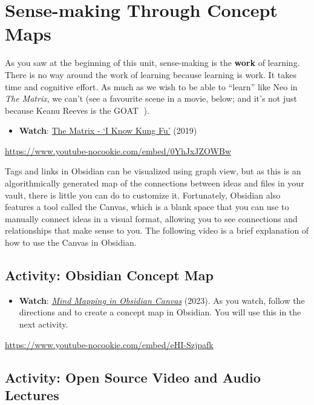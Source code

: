 \documentclass[
  letterpaper,
  DIV=11,
  numbers=noendperiod]{scrreprt}
\providecommand{\tightlist}{%
  \setlength{\itemsep}{0pt}\setlength{\parskip}{0pt}}\usepackage{longtable,booktabs,array}
\begin{document}
\section{Sense-making Through Concept
Maps}\label{sense-making-through-concept-maps}

As you saw at the beginning of this unit, sense-making is the
\textbf{work} of learning. There is no way around the work of learning
because learning is work. It takes time and cognitive effort. As much as
we wish to be able to ``learn'' like Neo in \emph{The Matrix}, we can't
(see a favourite scene in a movie, below; and it's not just because
Keanu Reeves is the GOAT 🐐).

\begin{itemize}
\tightlist
\item
  \textbf{Watch}: \href{https://www.youtube.com/watch?v=0YhJxJZOWBw}{The
  Matrix - `I Know Kung Fu'} (2019)
\end{itemize}

\url{https://www.youtube-nocookie.com/embed/0YhJxJZOWBw}

Tags and links in Obsidian can be visualized using graph view, but as
this is an algorithmically generated map of the connections between
ideas and files in your vault, there is little you can do to customize
it. Fortunately, Obsidian also features a tool called the Canvas, which
is a blank space that you can use to manually connect ideas in a visual
format, allowing you to see connections and relationships that make
sense to you. The following video is a brief explanation of how to use
the Canvas in Obsidian.

\subsection{Activity: Obsidian Concept
Map}\label{activity-obsidian-concept-map}

\begin{itemize}
\tightlist
\item
  \textbf{Watch}:
  \href{https://www.youtube.com/watch?v=eHI-Szjpafk}{\emph{Mind Mapping
  in Obsidian Canvas}} (2023). As you watch, follow the directions and
  to create a concept map in Obsidian. You will use this in the next
  activity.
\end{itemize}

\url{https://www.youtube-nocookie.com/embed/eHI-Szjpafk}

\subsection{Activity: Open Source Video and Audio
Lectures}\label{activity-open-source-video-and-audio-lectures}
\end{document}
